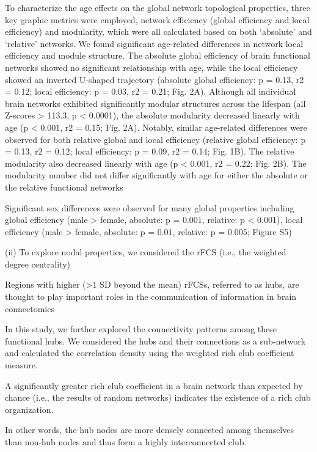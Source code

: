 To characterize the age effects on the global
network topological properties, three key graphic 
metrics were employed, network efficiency (global efficiency
and local efficiency) and modularity, which were all 
calculated based on both ‘absolute’ and ‘relative’ networks. We
found significant age-related differences in network local
efficiency and module structure. The absolute global 
efficiency of brain functional networks showed no significant
relationship with age, while the local efficiency showed
an inverted U-shaped trajectory (absolute global 
efficiency: p = 0.13, r2 = 0.12; local efficiency: p = 0.03, r2 = 0.21;
Fig. 2A). Although all individual brain networks 
exhibited significantly modular structures across the lifespan
(all Z-scores > 113.3, p < 0.0001), the absolute modularity
decreased linearly with age (p < 0.001, r2 = 0.15; Fig. 2A).
Notably, similar age-related differences were observed for
both relative global and local efficiency (relative global 
efficiency: p = 0.13, r2 = 0.12; local efficiency: p = 0.09, r2 = 0.14;
Fig. 1B). The relative modularity also decreased linearly
with age (p < 0.001, r2 = 0.22; Fig. 2B). The modularity number 
did not differ significantly with age for either the
absolute or the relative functional networks

Significant sex differences were observed for
many global properties including global efficiency
(male > female, absolute: p = 0.001, relative: p < 0.001),
local efficiency (male > female, absolute: p = 0.01, relative:
p = 0.005; Figure S5)


(ii) To explore nodal properties, we considered the rFCS
(i.e., the weighted degree centrality)

Regions with higher (>1 SD beyond the mean) rFCSs,
referred to as hubs, are thought to play important roles in
the communication of information in brain connectomics

In this study, we further explored the connectivity patterns
among these functional hubs. We considered the hubs and
their connections as a sub-network and calculated the correlation 
density using the weighted rich club coefficient
measure.  

A significantly greater rich club coefficient in a brain network
than expected by chance (i.e., the results of random networks) indicates 
the existence of a rich club organization.

In other words, the hub nodes are more densely connected
among themselves than non-hub nodes and thus form a
highly interconnected club.

